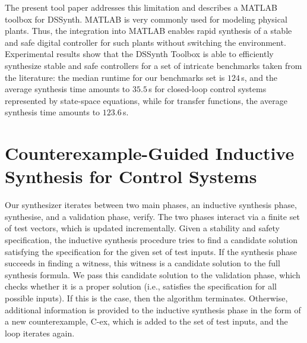 \documentclass[10pt,conference]{IEEEtran}
\newcommand\tool{{DSSynth Toolbox}\xspace}
\begin{document}
The present tool paper addresses this limitation and describes a MATLAB
toolbox for DSSynth.  MATLAB is very commonly used for modeling physical
plants.  Thus, the integration into MATLAB enables rapid synthesis of a
stable and safe digital controller for such plants without switching the
environment. Experimental results show that the \tool is able to efficiently 
synthesize stable and safe controllers for a set of intricate benchmarks taken 
from the literature:  the median runtime for our benchmarks set is $124$\,s, 
and the average synthesis time amounts to $35.5$\,s for closed-loop control 
systems represented by state-space equations, while for transfer functions, the average synthesis
time amounts to $123.6$\,s.

\section{Counterexample-Guided Inductive Synthesis for Control Systems}
\label{sec:CEGIS}



Our synthesizer iterates between two main phases, an inductive synthesis
phase, {\sc synthesise}, and a validation phase, {\sc verify}.  The two
phases interact via a finite set of test vectors, which is updated
incrementally.  Given a stability and safety specification, the inductive
synthesis procedure tries to find a candidate solution satisfying the
specification for the given set of test inputs.
%
If the synthesis phase succeeds in finding a witness, this witness is a
candidate solution to the full synthesis formula.  We pass this candidate
solution to the validation phase, which checks whether it is a proper solution
(i.e., satisfies the specification for all possible inputs).  If this is the
case, then the algorithm terminates.  Otherwise, additional information is
provided to the inductive synthesis phase in the form of a new
counterexample, C-ex, which is added to the set of test inputs, and the loop
iterates again.
\end{document}
